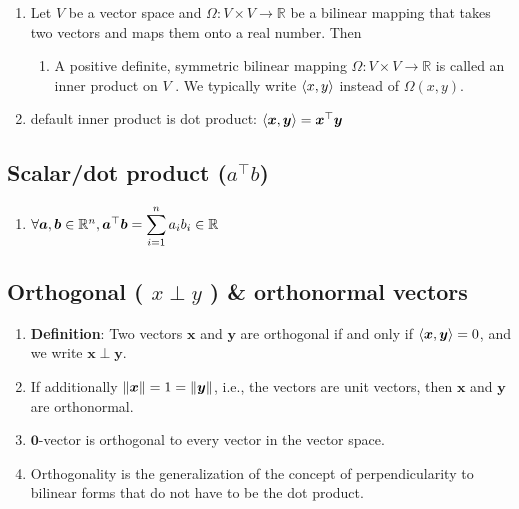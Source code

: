 \begin{enumerate}
    \item Let $V$ be a vector space and $\Omega  : V \times  V \to  \mathbb{R}$ be a bilinear mapping that takes two vectors and maps them onto a real number. Then
    \hfill \cite{mfml/book/mml/Deisenroth-Faisal-Ong}
    \begin{enumerate}
        \item A positive definite, symmetric bilinear mapping $\Omega  : V \times  V \to  \mathbb{R}$ is called an inner product on $V$ . 
        We typically write $\langle x, y\rangle$ instead of $\Omega (x, y)$.        
        \hfill \cite{mfml/book/mml/Deisenroth-Faisal-Ong}
    \end{enumerate}

    \item default inner product is dot product: $\langle\bm{x}, \bm{y}\rangle = \bm{x}^\top \bm{y}$
    \hfill \cite{mfml/book/mml/Deisenroth-Faisal-Ong}
\end{enumerate}





\subsection{Scalar/dot product ($a^\top b$)}


\begin{enumerate}
    \item $
        \forall \bm{a}, \bm{b} \in \mathbb{R}^n, 
        \bm{a}^\top \bm{b} = \displaystyle\sum^n_{i=1} a_i b_i \in \mathbb{R}    
    $
    \hfill \cite{mfml/book/mml/Deisenroth-Faisal-Ong}
    
\end{enumerate}



\subsection{Orthogonal ( $x \perp y$ ) \& orthonormal vectors}

\begin{enumerate}
    \item \textbf{Definition}: Two vectors $\bm{x}$ and $\bm{y}$ are orthogonal if and only if $\langle\bm{x}, \bm{y}\rangle = 0$, and we write $\bm{x} \perp \bm{y}$. 
    \hfill \cite{mfml/book/mml/Deisenroth-Faisal-Ong}
    
    \item If additionally $\left\| \bm{x} \right\| = 1 = \left\| \bm{y} \right\|$, i.e., the vectors are unit vectors, then $\bm{x}$ and $\bm{y}$ are orthonormal.
    \hfill \cite{mfml/book/mml/Deisenroth-Faisal-Ong}

    \item $\bm{0}$-vector is orthogonal to every vector in the vector space.
    \hfill \cite{mfml/book/mml/Deisenroth-Faisal-Ong}

    \item Orthogonality is the generalization of the concept of perpendicularity to bilinear forms that do not have to be the dot product.
    \hfill \cite{mfml/book/mml/Deisenroth-Faisal-Ong}
\end{enumerate}




